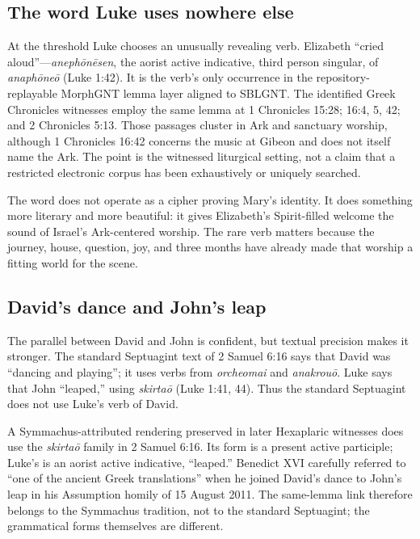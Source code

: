 \subsection{The word Luke uses nowhere else}

At the threshold Luke chooses an unusually revealing verb.  Elizabeth
``cried aloud''---\emph{anephōnēsen}, the aorist active indicative, third person
singular, of \emph{anaphōneō} (Luke 1:42).  It is the verb's only occurrence in
the repository-replayable MorphGNT lemma layer aligned to SBLGNT.  The
identified Greek Chronicles witnesses employ the same lemma at
1 Chronicles 15:28; 16:4, 5, 42; and 2 Chronicles 5:13.  Those passages cluster
in Ark and sanctuary worship, although 1 Chronicles 16:42 concerns the music
at Gibeon and does not itself name the Ark.  The point is the witnessed
liturgical setting, not a claim that a restricted electronic corpus has been
exhaustively or uniquely searched.

The word does not operate as a cipher proving Mary's identity.  It does
something more literary and more beautiful: it gives Elizabeth's Spirit-filled
welcome the sound of Israel's Ark-centered worship.  The rare verb matters
because the journey, house, question, joy, and three months have already made
that worship a fitting world for the scene.

\subsection{David's dance and John's leap}

The parallel between David and John is confident, but textual precision makes
it stronger.  The standard Septuagint text of 2 Samuel 6:16 says that David was
``dancing and playing''; it uses verbs from \emph{orcheomai} and
\emph{anakrouō}.  Luke says that John ``leaped,'' using
\emph{skirtaō} (Luke 1:41, 44).  Thus the standard Septuagint does not use
Luke's verb of David.

A Symmachus-attributed rendering preserved in later Hexaplaric witnesses does
use the \emph{skirtaō} family in 2 Samuel 6:16.  Its form is a present active
participle; Luke's is an aorist active indicative, ``leaped.''  Benedict XVI
carefully referred to
``one of the ancient Greek translations'' when he joined David's dance to
John's leap in his Assumption homily of 15 August 2011.  The same-lemma link
therefore belongs to the Symmachus tradition, not to the standard Septuagint;
the grammatical forms themselves are different.

